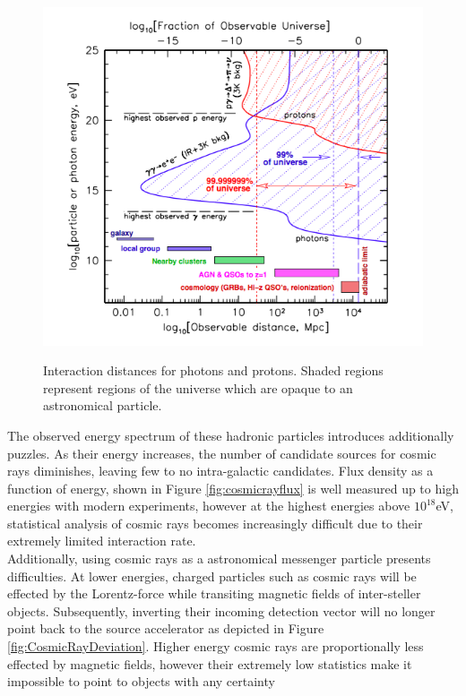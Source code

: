 \begin{figure}
\begin{centering}
\label{fig:observableUniverse}
	\includegraphics[width=\textwidth]{figures/ObservableUniverse}
	\caption{Interaction distances for photons and protons.  Shaded regions represent regions of the universe which are opaque to an astronomical particle.}
\end{centering}
\end{figure}
	
	The observed energy spectrum of these hadronic particles introduces additionally puzzles.   As their energy increases, the number of candidate sources for cosmic rays diminishes, leaving few to no intra-galactic candidates.\cite{RevModPhys.71.S33}  Flux density as a function of energy, shown in Figure \ref{fig:cosmicrayflux} is well measured up to high energies with modern experiments, however at the highest energies above $10^{18}$eV, statistical analysis of cosmic rays becomes increasingly difficult due to their extremely limited interaction rate.  \\

		

	Additionally, using cosmic rays as a astronomical messenger particle presents difficulties.  At lower energies, charged particles such as cosmic rays will be effected by the Lorentz-force while transiting magnetic fields of inter-steller objects. Subsequently, inverting their incoming detection vector will no longer point back to the source accelerator as depicted in Figure \ref{fig:CosmicRayDeviation}.  Higher energy cosmic rays are proportionally less effected by magnetic fields, however their extremely low statistics make it impossible to point to objects with any certainty \\
	
